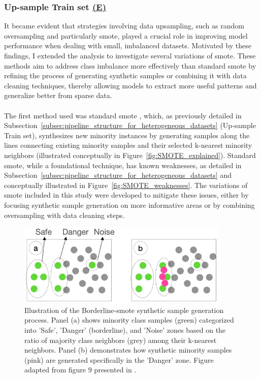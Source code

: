 \documentclass[12pt,a4paper]{report}
\begin{document}
\subsubsection*{Up-sample Train set \hyperref[fig:pipeline-2]{(E)}}
It became evident that strategies involving data upsampling, such as random oversampling and particularly \gls{smote}, played a crucial role in improving model performance when dealing with small, imbalanced datasets. Motivated by these findings, I extended the analysis to investigate several variations of \gls{smote}. These methods aim to address class imbalance more effectively than standard \gls{smote} by refining the process of generating synthetic samples or combining it with data cleaning techniques, thereby allowing models to extract more useful patterns and generalize better from sparse data.\\
\\
The first method used was standard \gls{smote} \cite{Chawla2002SMOTE}, which, as previously detailed in Subsection~\ref{subsec:pipeline_structure_for_heterogeneous_datasets} (Up-sample Train set), synthesizes new minority instances by generating samples along the lines connecting existing minority samples and their selected k-nearest minority neighbors (illustrated conceptually in Figure~\ref{fig:SMOTE_explained}). Standard \gls{smote}, while a foundational technique, has known weaknesses, as detailed in Subsection~\ref{subsec:pipeline_structure_for_heterogeneous_datasets} and conceptually illustrated in Figure~\ref{fig:SMOTE_weaknesses}. The variations of \gls{smote} included in this study were developed to mitigate these issues, either by focusing synthetic sample generation on more informative areas or by combining oversampling with data cleaning steps.\\
\begin{figure}[h!]
  \centering
  \includegraphics[width=0.9\textwidth]{images/SMOTE-Borderline.png}
  \caption[Illustration of Borderline-\gls{smote} Sample Generation]{Illustration of the Borderline-\gls{smote} synthetic sample generation process. Panel (a) shows minority class samples (green) categorized into 'Safe', 'Danger' (borderline), and 'Noise' zones based on the ratio of majority class neighbors (grey) among their k-nearest neighbors. Panel (b) demonstrates how synthetic minority samples (pink) are generated specifically in the 'Danger' zone. Figure adapted from figure 9 presented in \cite{Truong2022SMOTEVariants}.}
  \label{fig:SMOTE-Borderline}
\end{figure}
\end{document}
